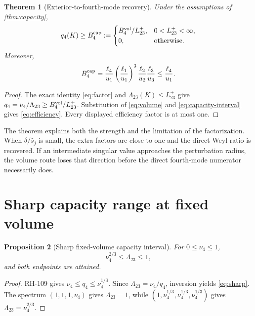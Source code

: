 \documentclass[11pt]{article}
\newtheorem{theorem}{Theorem}[section]
\newtheorem{proposition}[theorem]{Proposition}
\theoremstyle{remark}\newtheorem{remark}[theorem]{Remark}
\begin{document}
\begin{theorem}[Exterior-to-fourth-mode recovery]
\label{thm:recovery}
Under the assumptions of \cref{thm:capacity},
\begin{equation}
 q_4(K)\ge B_4^{\rm cap}:=
 \begin{cases}
 B_4^{\rm vol}/L_{23}^+,&0<L_{23}^+<\infty,\\
 0,&\text{otherwise}.
 \end{cases}
 \label{eq:recovery}
\end{equation}
Moreover,
\begin{equation}
 B_4^{\rm cap}
 =\frac{\ell_4}{u_1}
 \left(\frac{\ell_1}{u_1}\right)^3
 \frac{\ell_2}{u_2}\frac{\ell_3}{u_3}
 \le\frac{\ell_4}{u_1}.
 \label{eq:efficiency}
\end{equation}
\end{theorem}
\begin{proof}
The exact identity \eqref{eq:factor} and
$\Lambda_{23}(K)\le L_{23}^+$ give
$q_4=\nu_4/\Lambda_{23}\ge B_4^{\rm vol}/L_{23}^+$.  Substitution of
\eqref{eq:volume} and \eqref{eq:capacity-interval} gives
\eqref{eq:efficiency}.  Every displayed efficiency factor is at most one.
\end{proof}

The theorem explains both the strength and the limitation of the
factorization.  When $\delta/\widehat s_j$ is small, the extra factors are
close to one and the direct Weyl ratio is recovered.  If an intermediate
singular value approaches the perturbation radius, the volume route loses
that direction before the direct fourth-mode numerator necessarily does.

\section{Sharp capacity range at fixed volume}
\begin{proposition}[Sharp fixed-volume capacity interval]
\label{prop:sharp}
For $0\le\nu_4\le1$,
\begin{equation}
 \nu_4^{2/3}\le\Lambda_{23}\le1,
 \label{eq:sharp}
\end{equation}
and both endpoints are attained.
\end{proposition}
\begin{proof}
RH-109 gives $\nu_4\le q_4\le\nu_4^{1/3}$.  Since
$\Lambda_{23}=\nu_4/q_4$, inversion yields \eqref{eq:sharp}.  The spectrum
$(1,1,1,\nu_4)$ gives $\Lambda_{23}=1$, while
$(1,\nu_4^{1/3},\nu_4^{1/3},\nu_4^{1/3})$ gives
$\Lambda_{23}=\nu_4^{2/3}$.
\end{proof}
\end{document}

